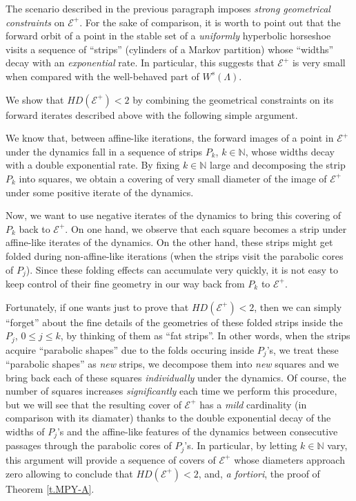 \documentclass[12pt]{amsart}
\numberwithin{equation}{section}
\theoremstyle{definition}
\newcommand{\<}{{\langle}}
\renewcommand{\>}{{\rangle}}
\begin{document}
The scenario described in the previous paragraph imposes \emph{strong geometrical constraints} on $\mathcal{E}^+$. For the sake of comparison, it is worth to point out that the forward orbit of a point in the stable set of a \emph{uniformly} hyperbolic horseshoe visits a sequence of ``strips'' (cylinders of a Markov partition) whose ``widths'' decay with an \emph{exponential} rate. In particular, this suggests that $\mathcal{E}^+$ is very small when compared with the well-behaved part of $W^s(\Lambda)$. 

We show that $HD(\mathcal{E}^+)<2$ by combining the geometrical constraints on its forward iterates described above with the following simple argument. 

We know that, between affine-like iterations, the forward images of a point in $\mathcal{E}^+$ under the dynamics fall in a sequence of strips $P_k$, $k\in\mathbb{N}$, whose widths decay with a double exponential rate. By fixing $k\in\mathbb{N}$ large and decomposing the strip $P_k$ into squares, we obtain a covering of very small diameter of the image of $\mathcal{E}^+$ under some positive iterate of the dynamics. 

Now, we want to use negative iterates of the dynamics to bring this covering of $P_k$ back to $\mathcal{E}^+$. On one hand, we observe that each square becomes a strip under affine-like iterates of the dynamics. On the other hand, these strips might get folded during non-affine-like iterations (when the strips visit the parabolic cores of $P_j$). Since these folding effects can accumulate very quickly, it is not easy to keep control of their fine geometry in our way back from $P_k$ to $\mathcal{E}^+$. 

Fortunately, if one wants just to prove that $HD(\mathcal{E}^+)<2$, then we can simply ``forget'' about the fine details of the geometries of these folded strips inside the $P_j$, $0\leq j\leq k$, by thinking of them as ``fat strips''. In other words, when the strips acquire ``parabolic shapes'' due to the folds occuring inside $P_j$'s, we treat these ``parabolic shapes'' as \emph{new} strips, we decompose them into \emph{new} squares and we bring back each of these squares \emph{individually} under the dynamics. Of course, the number of squares increases \emph{significantly} each time we perform this procedure, but we will see that the resulting cover of $\mathcal{E}^+$ has a \emph{mild} cardinality (in comparison with its diamater) thanks to the double exponential decay of the widths of $P_j$'s and the affine-like features of the dynamics between consecutive passages through the parabolic cores of $P_j$'s. In particular, by letting $k\in\mathbb{N}$ vary, this argument will provide a sequence of covers of $\mathcal{E}^+$ whose diameters approach zero allowing to conclude that $HD(\mathcal{E}^+)<2$, and, \emph{a fortiori}, the proof of Theorem \ref{t.MPY-A}.
\end{document}
